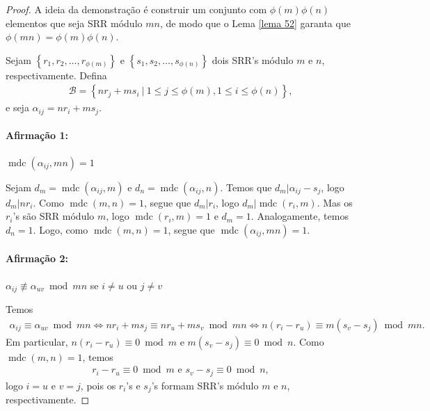 \documentclass[a4paper,11pt,twoside, leqno]{article}
\DeclareMathOperator{\mdc}{mdc}
\theoremstyle{definition}
\begin{document}
\begin{proof}
	A ideia da demonstração é construir um conjunto com $\phi(m)\phi(n)$ elementos que seja SRR módulo $mn$, de modo que o Lema \eqref{lema 52} garanta que $\phi(mn) = \phi(m)\phi(n)$.
	\par\vspace{0.3cm} Sejam $\left\{ r_1, r_2, \dots, r_{\phi(m)} \right\}$ e $\left\{ s_1, s_2, \dots, s_{\phi(n)} \right\}$ dois SRR's módulo $m$ e $n$, respectivamente. Defina
	\begin{align*}
	\mathcal{B} = \left\{ nr_j + ms_i \ | \ 1\leq j\leq \phi(m), 1\leq i\leq \phi(n) \right\},
	\end{align*}
	e seja $\alpha_{ij} = nr_i + ms_j$.
	\paragraph{Afirmação 1:} $\mdc(\alpha_{ij},mn) = 1$
	\par\vspace{0.3cm} Sejam $d_m = \mdc(\alpha_{ij}, m)$ e $d_n = \mdc(\alpha_{ij},n).$ Temos que $d_m|\alpha_{ij} - s_j$, logo $d_m|nr_i$. Como $\mdc(m,n) = 1$, segue que $d_m|r_i$, logo $d_m|\mdc(r_i,m)$. Mas os $r_i$'s são SRR módulo $m$, logo $\mdc(r_i,m) = 1$ e $d_m = 1.$ Analogamente, temos $d_n = 1$. Logo, como $\mdc(m,n) = 1$, segue que $\mdc(\alpha_{ij}, mn)= 1$.
	\paragraph{Afirmação 2:} $\alpha_{ij}\not\equiv\alpha_{uv}\bmod mn$ se $i\neq u$ ou $j\neq v$
	\par\vspace{0.3cm} Temos
	\begin{align*}
	\alpha_{ij} \equiv \alpha_{uv}\bmod mn \Leftrightarrow nr_i + ms_j \equiv nr_u + ms_v\bmod mn \Leftrightarrow n(r_i - r_u) \equiv m(s_v - s_j)\bmod mn.
	\end{align*}
	Em particular, $n(r_i - r_u)\equiv 0\bmod m$ e $m(s_v - s_j)\equiv 0\bmod n$. Como $\mdc(m,n) = 1$, temos
	\begin{align*}
	r_i - r_u \equiv 0\bmod m \text{ e } s_v - s_j \equiv 0\bmod n,
	\end{align*}
	logo $i = u$ e $v = j$, pois os $r_i$'s e $s_j$'s formam SRR's módulo $m$ e $n$, respectivamente.

\end{proof}
\end{document}

